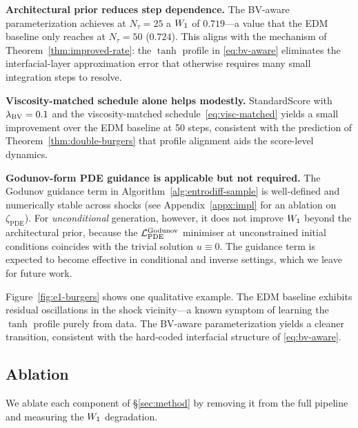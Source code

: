 \begin{enumerate*}[label=(\roman*)]
  \item \textbf{Architectural prior reduces step dependence.}
    The {BV}-aware parameterization achieves at $N_{\tau}=25$ a $W_{1}$ of $0.719$---a
    value that the EDM baseline only reaches at $N_{\tau}=50$
    ($0.724$). This aligns with the mechanism of
    Theorem~\ref{thm:improved-rate}: the $\tanh$ profile in
    \eqref{eq:bv-aware} eliminates the interfacial-layer approximation error
    that otherwise requires many small integration steps to resolve.
  \item \textbf{Viscosity-matched schedule alone helps modestly.}
    StandardScore with $\lambda_{\mathrm{BV}}=0.1$ and the viscosity-matched
    schedule~\eqref{eq:visc-matched} yields a small improvement over the
    EDM baseline at 50 steps, consistent with the prediction of
    Theorem~\ref{thm:double-burgers} that profile alignment aids the
    score-level dynamics.
  \item \textbf{Godunov-form PDE guidance is applicable but not required.}
    The Godunov guidance term in Algorithm~\ref{alg:entrodiff-sample} is
    well-defined and numerically stable across shocks (see
    Appendix~\ref{appx:impl} for an ablation on $\zeta_{\mathrm{PDE}}$).
    For \emph{unconditional} generation, however, it does not improve
    $W_{1}$ beyond the architectural prior, because the
    $\mathcal{L}_{\mathrm{PDE}}^{\mathrm{Godunov}}$ minimiser at unconstrained initial conditions
    coincides with the trivial solution $u\equiv 0$. The
    guidance term is expected to become effective in conditional and inverse
    settings, which we leave for future work.
\end{enumerate*}

Figure~\ref{fig:e1-burgers} shows one qualitative example. The EDM baseline
exhibits residual oscillations in the shock vicinity---a known symptom of
learning the $\tanh$ profile purely from data. The {BV}-aware parameterization
yields a
cleaner transition, consistent with the hard-coded interfacial structure of
\eqref{eq:bv-aware}.

\subsection{Ablation}
\label{sec:exp:ablation}

We ablate each component of \S\ref{sec:method} by removing it from the full
pipeline and measuring the $W_{1}$ degradation.

